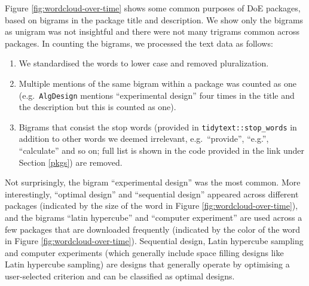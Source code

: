 \documentclass{article}
\providecommand{\tightlist}{%
  \setlength{\itemsep}{0pt}\setlength{\parskip}{0pt}}
\def\tightlist{}
\begin{document}
Figure \ref{fig:wordcloud-over-time} shows some common purposes of DoE
packages, based on bigrams in the package title and description. We show
only the bigrams as unigram was not insightful and there were not many
trigrams common across packages. In counting the bigrams, we processed
the text data as follows:

\begin{enumerate}
\def\labelenumi{\arabic{enumi}.}
\tightlist
\item
  We standardised the words to lower case and removed pluralization.
\item
  Multiple mentions of the same bigram within a package was counted as
  one (e.g.~\texttt{AlgDesign} mentions ``experimental design'' four
  times in the title and the description but this is counted as one).
\item
  Bigrams that consist the stop words (provided in
  \texttt{tidytext::stop\_words} in addition to other words we deemed
  irrelevant, e.g.~``provide'', ``e.g.'', ``calculate'' and so on; full
  list is shown in the code provided in the link under Section
  \ref{pkgs}) are removed.
\end{enumerate}

Not surprisingly, the bigram ``experimental design'' was the most
common. More interestingly, ``optimal design'' and ``sequential design''
appeared across different packages (indicated by the size of the word in
Figure \ref{fig:wordcloud-over-time}), and the bigrams ``latin
hypercube'' and ``computer experiment'' are used across a few packages
that are downloaded frequently (indicated by the color of the word in
Figure \ref{fig:wordcloud-over-time}). Sequential design, Latin
hypercube sampling and computer experiments (which generally include
space filling designs like Latin hypercube sampling) are designs that
generally operate by optimising a user-selected criterion and can be
classified as optimal designs.
\end{document}
